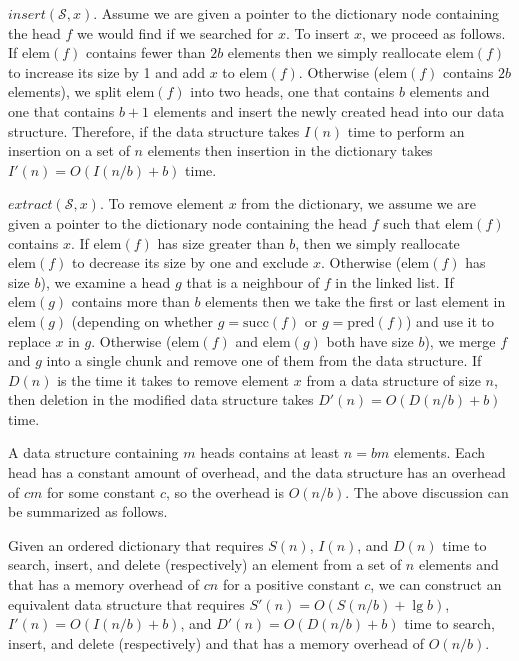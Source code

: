 \documentclass{DIKU-article}
\newcommand{\Insert}{\mbox{$\mathit{insert}$}}
\newcommand{\Extract}{\mbox{$\mathit{extract}$}}
\newcommand{\Pred}{\mathrm{pred}}
\newcommand{\Succ}{\mathrm{succ}}
\newcommand{\Elem}{\mathrm{elem}}
\begin{document}
{\Insert{}$(\mathcal{S}, x)$.
Assume we are given a pointer to the dictionary node containing the
head $f$ we would find if we searched for $x$.  To insert $x$, we
proceed as follows.  If $\Elem(f)$ contains fewer than $2b$ elements
then we simply reallocate $\Elem(f)$ to increase its size by 1 and add
$x$ to $\Elem(f)$.  Otherwise ($\Elem(f)$ contains $2b$ elements), we split
$\Elem(f)$ into two heads, one that contains $b$ elements and one
that contains $b+1$ elements and insert the newly created head
into our data structure.  Therefore, if the data structure takes
$I(n)$ time to perform an insertion on a set of $n$ elements then
insertion in the dictionary takes $I'(n)=O(I(n/b)+b)$ time.

\Extract{}$(\mathcal{S}, x)$.
To remove element $x$ from the dictionary, we assume we are given a
pointer to the dictionary node containing the head $f$ such that
$\Elem(f)$ contains $x$.  If $\Elem(f)$ has size greater than $b$, then
we simply reallocate $\Elem(f)$ to decrease its size by one and exclude
$x$.  Otherwise ($\Elem(f)$ has size $b$), we examine a head $g$
that is a neighbour of $f$ in the linked list.  If $\Elem(g)$ contains
more than $b$ elements then we take the first or last element in
$\Elem(g)$ (depending on whether $g=\Succ(f)$ or $g=\Pred(f)$) and use it
to replace $x$ in $g$.  Otherwise ($\Elem(f)$ and $\Elem(g)$ both have
size $b$), we merge $f$ and $g$ into a single chunk and remove one
of them from the data structure.  If $D(n)$ is the time it takes to
remove element $x$ from a data structure of size $n$, then deletion
in the modified data structure takes $D'(n)=O(D(n/b)+b)$ time.

A data structure containing $m$ heads contains at least $n=bm$
elements.  Each head has a constant amount of overhead, and the data
structure has an overhead of $cm$ for some constant $c$, so the
overhead is $O(n/b)$. The above discussion can be summarized as
follows.

\begin{theorem}
\label{theorem:elementary}
Given an ordered dictionary that requires
$S(n)$, $I(n)$, and $D(n)$ time to search, insert, and delete
(respectively) an element from a set of $n$ elements and that has a memory
overhead of $cn$ for a positive constant $c$, we can construct an equivalent
data structure that requires $S'(n)=O(S(n/b)+\lg b)$,
$I'(n)=O(I(n/b)+b)$, and $D'(n)=O(D(n/b)+b)$ time to
search, insert, and delete (respectively) and that has a memory
overhead of $O(n/b)$.
\end{theorem}
}
\end{document}
